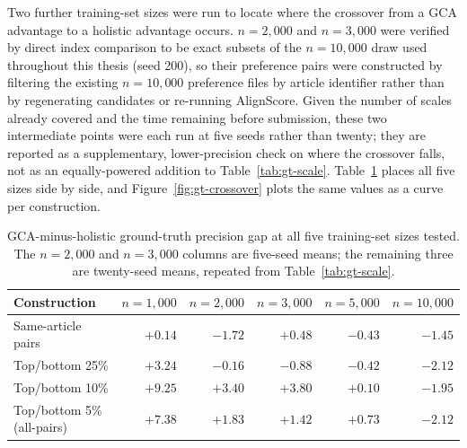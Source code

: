 Two further training-set sizes were run to locate where the crossover from a
GCA advantage to a holistic advantage occurs. $n=2{,}000$ and $n=3{,}000$
were verified by direct index comparison to be exact subsets of the
$n=10{,}000$ draw used throughout this thesis (seed 200), so their
preference pairs were constructed by filtering the existing $n=10{,}000$
preference files by article identifier rather than by regenerating
candidates or re-running AlignScore. Given the number of scales already
covered and the time remaining before submission, these two intermediate
points were each run at five seeds rather than twenty; they are reported as
a supplementary, lower-precision check on where the crossover falls, not as
an equally-powered addition to Table~\ref{tab:gt-scale}.
Table~\ref{tab:gt-curve} places all five sizes side by side, and
Figure~\ref{fig:gt-crossover} plots the same values as a curve per
construction.

\begin{table}[htbp]
\centering
\caption[Ground-truth precision gap, all five training-set sizes]{GCA-minus-holistic ground-truth precision gap at all five
training-set sizes tested. The $n=2{,}000$ and $n=3{,}000$ columns are
five-seed means; the remaining three are twenty-seed means, repeated from
Table~\ref{tab:gt-scale}.}
\label{tab:gt-curve}
\begin{tabular}{lrrrrr}
\toprule
Construction & $n{=}1{,}000$ & $n{=}2{,}000$ & $n{=}3{,}000$ & $n{=}5{,}000$ & $n{=}10{,}000$ \\
\midrule
Same-article pairs        & $+0.14$ & $-1.72$ & $+0.48$ & $-0.43$ & $-1.45$ \\
Top/bottom 25\%           & $+3.24$ & $-0.16$ & $-0.88$ & $-0.42$ & $-2.12$ \\
Top/bottom 10\%           & $+9.25$ & $+3.40$ & $+3.80$ & $+0.10$ & $-1.95$ \\
Top/bottom 5\% (all-pairs) & $+7.38$ & $+1.83$ & $+1.42$ & $+0.73$ & $-2.12$ \\
\bottomrule
\end{tabular}
\end{table}

